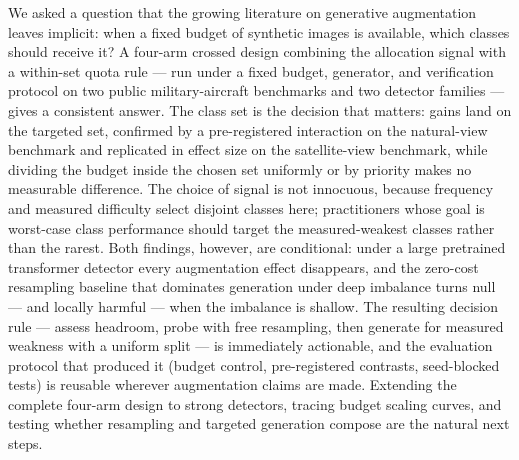 \documentclass[preprint,12pt,authoryear]{elsarticle}
\begin{document}
We asked a question that the growing literature on generative
augmentation leaves implicit: when a fixed budget of synthetic images is
available, which classes should receive it? A four-arm crossed design
combining the allocation signal with a within-set quota rule --- run
under a fixed budget, generator, and verification protocol on two public
military-aircraft benchmarks and two detector families --- gives a
consistent answer. The class set is the decision
that matters: gains land on the targeted set, confirmed by a
pre-registered interaction on the natural-view benchmark and replicated
in effect size on the satellite-view benchmark, while dividing the
budget inside the chosen set uniformly or by priority makes no
measurable difference. The choice of signal is not innocuous, because
frequency and measured difficulty select disjoint classes here;
practitioners whose goal is worst-case class performance should target
the measured-weakest classes rather than the rarest. Both findings,
however, are conditional: under a large pretrained transformer detector
every augmentation effect disappears, and the zero-cost resampling
baseline that dominates generation under deep imbalance turns null ---
and locally harmful --- when the imbalance is shallow. The resulting
decision rule --- assess headroom, probe with free resampling, then
generate for measured weakness with a uniform split --- is immediately
actionable, and the evaluation protocol that produced it (budget
control, pre-registered contrasts, seed-blocked tests) is reusable
wherever augmentation claims are made. Extending the complete four-arm
design to strong detectors, tracing budget scaling curves, and testing
whether resampling and targeted generation compose are the natural next
steps.





\end{document}
